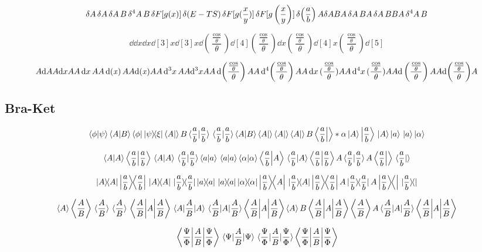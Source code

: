 \documentclass{article}
\DeclareMathOperator{\ddx}{{\rm d}(\it x)}
\begin{document}
\[
  \var A
  \var{A}
  \var{A}{B}
  \var[4]{A} B
  \var{F[g(x)]}
  \var(E-TS)
  \var{F[g(\frac{x}{y})]}
  \var{F[g\left(\frac{x}{y}\right)]}
  \var(\frac{a}{b})
  A \var A B
  A \var{A} B
  A \var{A}{B} B
  A \var[4]{A} B
\]


\[
  \dd
  \dd x
  \dd{x}
  \dd[3]{x}
  \dd[3]x
  \dd(\frac{\frac{\cos}{\theta}}{\theta})
  \dd[4](\frac{\frac{\cos}{\theta}}{\theta})
  \dd{x}(\frac{\frac{\cos}{\theta}}{\theta})
  \dd[4]{x}(\frac{\frac{\cos}{\theta}}{\theta})
  \dd[5]
\]

\[
  A\dd A
  A\dd x A
  A\dd{x} A
  A\ddx A
  A{{\rm d}(\it x)}A
  A\dd[3]{x} A
  A\dd[3]x A
  A\dd(\frac{\frac{\cos}{\theta}}{\theta}) A
  A\dd[4](\frac{\frac{\cos}{\theta}}{\theta})A
  A\dd{x}(\frac{\frac{\cos}{\theta}}{\theta})A
  A\dd[4]{x}(\frac{\frac{\cos}{\theta}}{\theta})A
  A{\rm d}\left(\frac{\frac{\cos}{\theta}}{\theta}\right) A
  A{\rm d}{\left(\frac{\frac{\cos}{\theta}}{\theta}\right)} A
\]


\newpage
\subsection*{Bra-Ket}

\[
  \bra{\phi}\ket{\psi}
  \bra{A}\ket{B}
  \bra{\phi}\dyad{\psi}{\xi}
  \bra A  \ket B
  \bra*{\frac{a}{b}}  \ket{\frac{a}{b}}
  \bra{\frac{a}{b}}  \ket*{\frac{a}{b}}
  \bra A\ket{B}
  \bra A\ket 
  \bra {A}\ket 
  \bra {A}\ket B
  \bra {\frac{a}{b}} \ket* \alpha
  \ket{A}
  \ket{\frac{a}{b}}
  \ket*{A}
  \ket a
  \ket* a
  \ket \alpha
\]

\[
  \braket{A}
  \braket{\frac{a}{b}}
  \braket*{A}
  \braket*{\frac{a}{b}}
  \braket a
  \braket* a
  \braket \alpha
  \braket{\frac{a}{b}}{A}
  \braket*{\frac{a}{b}}{A}
  \braket{\frac{a}{b}}  A
  \braket*{\frac{a}{b}}   A
  \braket{\frac{a}{b}}{} 
  \braket*{\frac{a}{b}}{}
\]

\[
  \ketbra{A}
  \ketbra{\frac{a}{b}}
  \ketbra*{A}
  \ketbra*{\frac{a}{b}}
  \ketbra a
  \ketbra* a
  \ketbra \alpha
  \ketbra{\frac{a}{b}}{A}
  \ketbra*{\frac{a}{b}}{A}
  \ketbra{\frac{a}{b}}  A
  \ketbra*{\frac{a}{b}}   A
  \ketbra{\frac{a}{b}}{} 
  \ketbra*{\frac{a}{b}}{}
\]

\[
  \ev{A}
  \ev{\frac{A}{B}}
  \ev*{\frac{A}{B}}
  \ev**{\frac{A}{B}}
  \ev{A}{\frac{A}{B}}
  \ev{\frac{A}{B}}{A}
  \ev*{A}{\frac{A}{B}}
  \ev**{A} {\frac{A}{B}}
  \ev A B
  \ev A {\frac{A}{B}}
  \ev {\frac{A}{B}} A
  \ev* A {\frac{A}{B}}
  \ev** A {\frac{A}{B}}
\]

\[
  \ev{\frac{A}{B}}{\frac{\Psi}{\Phi}}
  \ev{\frac{A}{B}}{{\Psi}}
  \ev*{\frac{A}{B}}{\frac{\Psi}{\Phi}}
  \ev**{\frac{A}{B}}{\frac{\Psi}{\Phi}}
\]
\end{document}
